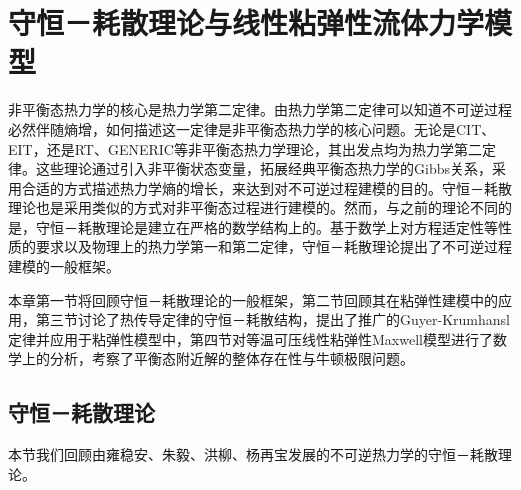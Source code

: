  \chapter{守恒－耗散理论与线性粘弹性流体力学模型}

 	非平衡态热力学的核心是热力学第二定律。由热力学第二定律可以知道不可逆过程必然伴随熵增，如何描述这一定律是非平衡态热力学的核心问题。无论是CIT、EIT，还是RT、GENERIC等非平衡态热力学理论，其出发点均为热力学第二定律。这些理论通过引入非平衡状态变量，拓展经典平衡态热力学的Gibbs关系，采用合适的方式描述热力学熵的增长，来达到对不可逆过程建模的目的。守恒－耗散理论也是采用类似的方式对非平衡态过程进行建模的。然而，与之前的理论不同的是，守恒－耗散理论是建立在严格的数学结构上的。基于数学上对方程适定性等性质的要求以及物理上的热力学第一和第二定律，守恒－耗散理论提出了不可逆过程建模的一般框架\cite{zhu2014conservation,ottinger2005beyond,jou1996extended}。
	
	本章第一节将回顾守恒－耗散理论的一般框架，第二节回顾其在粘弹性建模中的应用，第三节讨论了热传导定律的守恒－耗散结构，提出了推广的Guyer-Krumhansl定律并应用于粘弹性模型中，第四节对等温可压线性粘弹性Maxwell模型进行了数学上的分析，考察了平衡态附近解的整体存在性与牛顿极限问题。

	\section{守恒－耗散理论}
	本节我们回顾由雍稳安、朱毅、洪柳、杨再宝发展的不可逆热力学的守恒－耗散理论。

